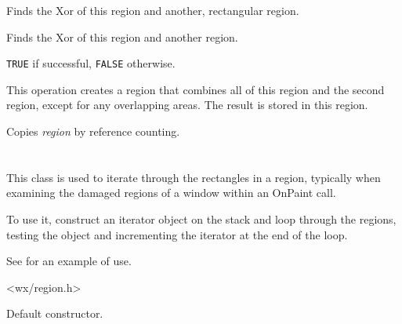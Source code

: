 
Finds the Xor of this region and another, rectangular region.


Finds the Xor of this region and another region.


{\tt TRUE} if successful, {\tt FALSE} otherwise.


This operation creates a region that combines all of this region and the second region, except
for any overlapping areas. The result is stored in this region.

\label{wxregionassign}


Copies {\it region} by reference counting.

\section{}\label{wxregioniterator}

This class is used to iterate through the rectangles in a region,
typically when examining the damaged regions of a window within an OnPaint call.

To use it, construct an iterator object on the stack and loop through the
regions, testing the object and incrementing the iterator at the end of the loop.

See  for an example of use.




<wx/region.h>






Default constructor.


